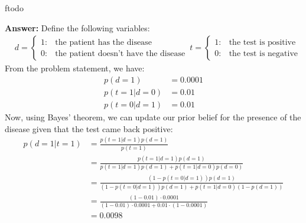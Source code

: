 ƒtodo\documentclass{article}
\newenvironment{QandA}{\begin{enumerate}[label=\arabic*.]}{\end{enumerate}}
\newenvironment{InnerQandA}{\begin{enumerate}[label=\roman*.]}{\end{enumerate}}
\newenvironment{answer}{\par\normalfont \textbf{Answer:}}{}
\newcommand{\g}{\vert}
\begin{document}
\begin{QandA}
\begin{InnerQandA}
\begin{answer}
            Define the following variables:
            \begin{align*}
                &d = \begin{cases}
                    1: &\text{the patient has the disease} \\
                    0: &\text{the patient doesn't have the disease}
                \end{cases}
                &t = \begin{cases}
                    1: &\text{the test is positive} \\
                    0: &\text{the test is negative}
                \end{cases}
            \end{align*}
            From the problem statement, we have:
            \begin{align*}
                p(d=1) &= 0.0001 \\
                p(t=1 \g d = 0) &= 0.01 \\
                p(t=0 \g d = 1) &= 0.01
            \end{align*}
            Now, using Bayes' theorem, we can update our prior belief for the presence of the disease given that the test came back positive:
            \begin{align*}
                p(d = 1 \g t = 1) &= \frac{p(t=1 \g d = 1) p(d = 1)}{p (t = 1)} \\
                &= \frac{p(t=1 \g d = 1) p(d = 1)}{p(t=1 \g d = 1) p(d = 1) + p(t=1 \g d = 0) p(d = 0)} \\
                &= \frac{(1-p(t=0 \g d = 1)) p(d = 1)}{(1-p(t=0 \g d = 1)) p(d = 1) + p(t=1 \g d = 0) (1-p(d = 1))} \\
                &= \frac{(1-0.01) \cdot 0.0001}{(1 - 0.01)\cdot 0.0001 + 0.01 \cdot (1-0.0001)} \\
                &= 0.0098
            \end{align*}
        \end{answer}


\end{InnerQandA}
\end{QandA}
\end{document}
